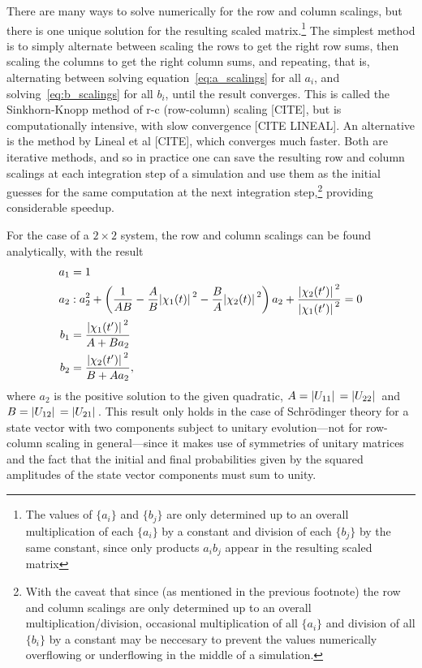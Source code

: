 There are many ways to solve numerically for the row and column scalings, but there is one unique solution for the resulting scaled matrix.\footnote{The values of $\{a_i\}$ and $\{b_j\}$ are only determined up to an overall multiplication of each $\{a_i\}$ by a constant and division of each $\{b_j\}$ by the same constant, since only products $a_i b_j$ appear in the resulting scaled matrix} The simplest method is to simply alternate between scaling the rows to get the right row sums, then scaling the columns to get the right column sums, and repeating, that is, alternating between solving equation~\eqref{eq:a_scalings} for all $a_i$, and solving~\eqref{eq:b_scalings} for all $b_i$, until the result converges. This is called the Sinkhorn-Knopp method of r-c (row-column) scaling [CITE], but is computationally intensive, with slow convergence [CITE LINEAL]. An alternative is the method by Lineal et al [CITE], which converges much faster. Both are iterative methods, and so in practice one can save the resulting row and column scalings at each integration step of a simulation and use them as the initial guesses for the same computation at the next integration step,\footnote{With the caveat that since (as mentioned in the previous footnote) the row and column scalings are only determined up to an overall multiplication/division, occasional multiplication of all $\{a_i\}$ and division of all $\{b_i\}$ by a constant may be neccesary to prevent the values numerically overflowing or underflowing in the middle of a simulation.} providing considerable speedup.

For the case of a $2\times2$ system, the row and column scalings can be found analytically, with the result
\begin{align}
a_1 &= 1\\
a_2 &: a_2^2 + 
\left(\frac1{AB} - \frac AB \abs{\chi_1(t)}^2 - \frac BA \abs{\chi_2(t)}^2\right)a_2
+ \frac{\abs{\chi_2(t^\prime)}^2}{\abs{\chi_1(t^\prime)}^2} = 0\\
b_1 &= \frac{\abs{\chi_1(t^\prime)}^2}{A + B a_2}\\
b_2 &= \frac{\abs{\chi_2(t^\prime)}^2}{B + A a_2},
\end{align}
where $a_2$ is the positive solution to the given quadratic, $A = \abs{U_{11}} = \abs{U_{22}}$ and $B = \abs{U_{12}} = \abs{U_{21}}$. This result only holds in the case of Schr\"odinger theory for a state vector with two components subject to unitary evolution---not for row-column scaling in general---since it makes use of symmetries of unitary matrices and the fact that the initial and final probabilities given by the squared amplitudes of the state vector components must sum to unity.

